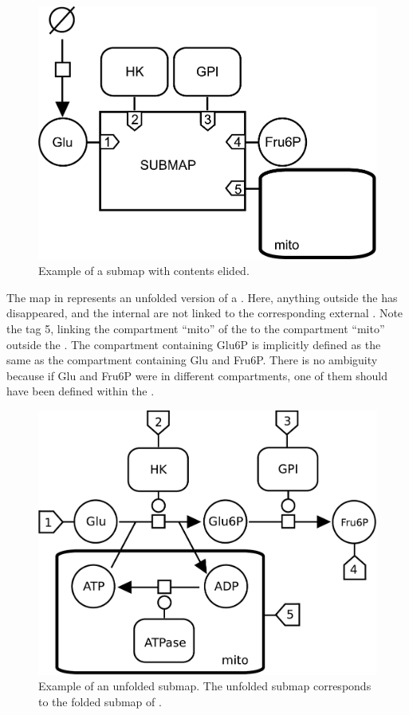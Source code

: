 \begin{figure}[H]
  \centering
  \includegraphics[scale = 0.4]{examples/submap-folded}
  \caption{Example of a submap with contents elided.}
  \label{fig:submap-folded}
\end{figure}

The map in  represents an unfolded version of a .  Here, anything outside the  has disappeared, and the internal  are not linked to the corresponding external .  Note the tag 5, linking the compartment ``mito'' of the  to the compartment ``mito'' outside the .  The compartment containing Glu6P is implicitly defined as the same as the compartment containing Glu and Fru6P.  There is no ambiguity because if Glu and Fru6P were in different compartments, one of them should have been defined within the .

\begin{figure}[H]
  \centering
  \includegraphics[scale = 0.35]{examples/submap-dissociated}
  \caption{Example of an unfolded submap. The unfolded submap corresponds to the folded submap of .}
  \label{fig:submap-unfolded}
\end{figure}


